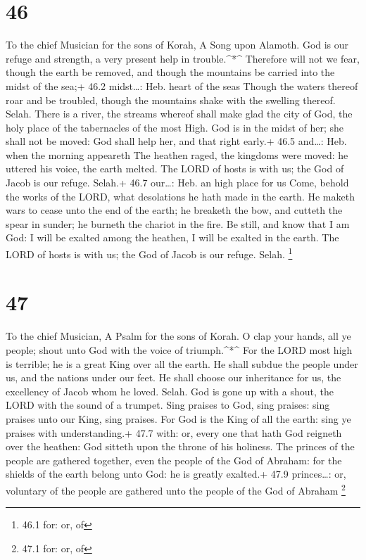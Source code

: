 \hypertarget{section-45}{%
\section{46}\label{section-45}}

To the chief Musician for the sons of Korah, A Song upon Alamoth.
 God is our refuge and strength, a very present help in
trouble.\^{}*\^{}  Therefore will not we fear, though the
earth be removed, and though the mountains be carried into the midst of
the sea;+ 46.2 midst\ldots: Heb. heart of the seas  Though
the waters thereof roar and be troubled, though the mountains shake with
the swelling thereof. Selah.  There is a river, the streams
whereof shall make glad the city of God, the holy place of the
tabernacles of the most High.  God is in the midst of her;
she shall not be moved: God shall help her, and that right early.+ 46.5
and\ldots: Heb. when the morning appeareth  The heathen
raged, the kingdoms were moved: he uttered his voice, the earth melted.
 The LORD of hosts is with us; the God of Jacob is our
refuge. Selah.+ 46.7 our\ldots: Heb. an high place for us 
Come, behold the works of the LORD, what desolations he hath made in the
earth.  He maketh wars to cease unto the end of the earth;
he breaketh the bow, and cutteth the spear in sunder; he burneth the
chariot in the fire.  Be still, and know that I am God: I
will be exalted among the heathen, I will be exalted in the earth.
 The LORD of hosts is with us; the God of Jacob is our
refuge. Selah. \footnote{46.1 for: or, of}

\hypertarget{section-46}{%
\section{47}\label{section-46}}

To the chief Musician, A Psalm for the sons of Korah.  O
clap your hands, all ye people; shout unto God with the voice of
triumph.\^{}*\^{}  For the LORD most high is terrible; he is
a great King over all the earth.  He shall subdue the people
under us, and the nations under our feet.  He shall choose
our inheritance for us, the excellency of Jacob whom he loved. Selah.
 God is gone up with a shout, the LORD with the sound of a
trumpet.  Sing praises to God, sing praises: sing praises
unto our King, sing praises.  For God is the King of all the
earth: sing ye praises with understanding.+ 47.7 with: or, every one
that hath  God reigneth over the heathen: God sitteth upon
the throne of his holiness.  The princes of the people are
gathered together, even the people of the God of Abraham: for the
shields of the earth belong unto God: he is greatly exalted.+ 47.9
princes\ldots: or, voluntary of the people are gathered unto the people
of the God of Abraham \footnote{47.1 for: or, of}

